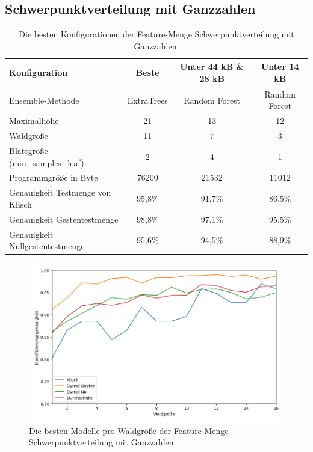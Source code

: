 \subsection{Schwerpunktverteilung mit Ganzzahlen}
\begin{table}[h!]
    \hspace{-0.5cm}
    \begin{tabular}{ | l | c | c | c |}
        \hline
        Konfiguration & Beste & Unter 44 kB \& 28 kB & Unter 14 kB \\\hline
        Ensemble-Methode & ExtraTrees & Random Forest & Random Forest \\\hline
        Maximalhöhe & 21 & 13 & 12 \\\hline
        Waldgröße & 11 & 7 & 3 \\\hline
        Blattgröße (min\_samples\_leaf) & 2 & 4 & 1 \\\hline
        Programmgröße in Byte & 76200 & 21532 & 11012 \\\hline
        Genauigkeit Testmenge von Klisch & 95,8\% & 91,7\% & 86,5\% \\\hline
        Genauigkeit Gestentestmenge & 98,8\% & 97,1\% & 95,5\% \\\hline
        Genauigkeit Nullgestentestmenge & 95,6\% & 94,5\% & 88,9\% \\\hline
    \end{tabular}
    \caption{Die besten Konfigurationen der Feature-Menge Schwerpunktverteilung mit Ganzzahlen.}
    \label{tab:schwerpunktverteilung_int}
\end{table}
\begin{figure}[h!]
    \centering
    \includegraphics[width=\linewidth]{images/cocd_int_acc_per_size.png}
    \caption{Die besten Modelle pro Waldgröße der Feature-Menge Schwerpunktverteilung mit Ganzzahlen.}
    \label{fig:cocd_int_per_forest_size}
\end{figure}
